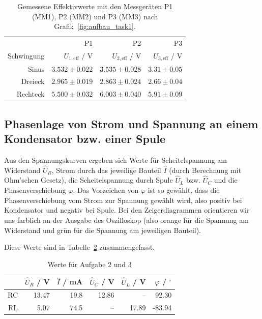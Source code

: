 \documentclass{article}
\begin{document}
\begin{table}[H]
\centering
\caption{Gemessene Effektivwerte mit den Messgeräten P1 (MM1), P2 (MM2) und P3 (MM3) nach Grafik~\ref{fig:aufbau_task1}.}
\label{tab:auswertung_task1_volt}
\begin{tabular}{r|rrr}
& P1 & P2 & P3 \\
Schwingung & $U_{1,\text{eff}}$ / V  & $U_{2,\text{eff}}$ / V & $U_{3,\text{eff}}$ / V \\
\hline
Sinus & $3.532\pm 0.022$ & $3.535 \pm 0.028$ & $3.31 \pm 0.05$ \\
Dreieck & $2.965\pm 0.019$ & $2.863 \pm 0.024$ & $2.66 \pm 0.04$ \\
Rechteck & $5.500\pm 0.032$ & $6.003 \pm 0.040$ & $5.91 \pm 0.09$
\end{tabular}
\end{table}





\subsection{Phasenlage von Strom und Spannung an einem Kondensator bzw. einer Spule}


Aus den Spannungskurven ergeben sich Werte für Scheitelspannung am Widerstand $\hat U_R$, Strom durch das jeweilige Bauteil $\hat I$ (durch Berechnung mit Ohm'schen Gesetz), die Scheitelspannung durch Spule $\hat U_L$ bzw. $\hat U_C$ und die Phasenverschiebung $\varphi$. Das Vorzeichen von $\varphi$ ist so gewählt, dass die Phasenverschiebung vom Strom zur Spannung gewählt wird, also positiv bei Kondensator und negativ bei Spule. Bei den Zeigerdiagrammen orientieren wir uns farblich an der Ausgabe des Oszilloskop (also orange für die Spannung am Widerstand und grün für die Spannung am jeweiligen Bauteil).

Diese Werte sind in Tabelle~\ref{tab:task23_auswertung} zusammengefasst.
\begin{table}[H]
\caption{Werte für Aufgabe 2 und 3}
\label{tab:task23_auswertung}
\begin{tabular}{r|rrrrr}
& $\hat U_R$ / V & $\hat I$ / mA & $\hat U_C$ / V & $\hat U_L$ / V & $\varphi$ / ${}^\circ$ \\
\hline
RC & 13.47 & 19.8 & 12.86 & -- & 92.30\\
RL & 5.07 & 74.5 & -- &  17.89 & -83.94
\end{tabular}

\end{table}
\end{document}
